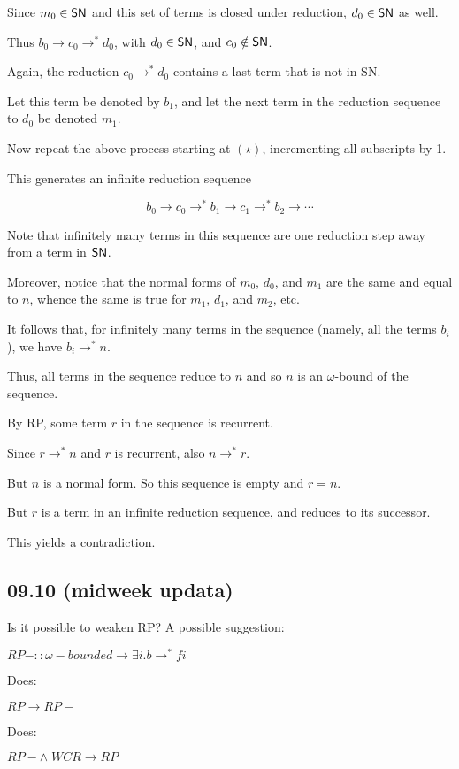 \documentclass{scrartcl}
\begin{document}
\begin{itemize}
  Since $m_0 \in \mathsf{SN}$ and this set of terms is closed under reduction, $d_0 \in \mathsf{SN}$ as well.

  Thus $b_0 \to c_0 \to^* d_0$, with $d_0 \in \mathsf{SN}$, and $c_0 \notin \mathsf{SN}$.

  Again, the reduction $c_0 \to^* d_0$ contains a last term that is not in SN.

  Let this term be denoted by $b_1$, and let the next term in the reduction sequence
  to $d_0$ be denoted $m_1$.

  Now repeat the above process starting at $(\star)$, incrementing all subscripts by 1.

  This generates an infinite reduction sequence

  \[b_0 \to c_0 \to^* b_1 \to c_1 \to^* b_2 \to \cdots \]

  Note that infinitely many terms in this sequence are one reduction step
  away from a term in $\mathsf{SN}$.

  Moreover, notice that the normal forms of $m_0$, $d_0$, and $m_1$ are the same
  and equal to $n$, whence the same is true for $m_1$, $d_1$, and $m_2$, etc.

  It follows that, for infinitely many terms in the sequence
  (namely, all the terms $b_i$), we have $b_i \to^* n$.

  Thus, all terms in the sequence reduce to $n$ and so $n$ is an $\omega$-bound
  of the sequence.

  By RP, some term $r$ in the sequence is recurrent.

  Since $r \to^* n$ and $r$ is recurrent, also $n \to^* r$.

  But $n$ is a normal form.  So this sequence is empty and $r=n$.

  But $r$ is a term in an infinite reduction sequence, and reduces to its successor.

  This yields a contradiction.

\end{itemize}
\subsection{09.10 (midweek updata)}
Is it possible to weaken RP? A possible suggestion:

$RP- :: \omega-bounded \to  \exists i. b \to^* f i$

Does:

$RP \to RP-$

Does:

$RP- \land \; WCR \to RP$
\end{document}
